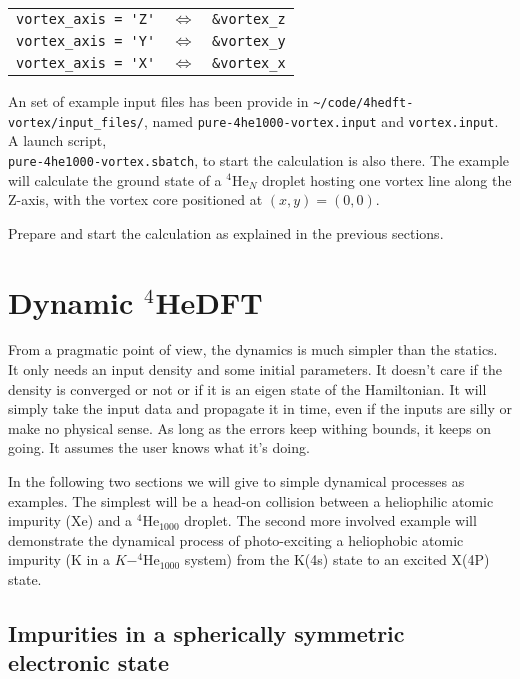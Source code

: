 \documentclass[10pt,a4paper]{article}
\begin{document}
	\begin{tabular}{ccc}
		\verb|vortex_axis = 'Z'|	& $\Longleftrightarrow$ & \verb|&vortex_z| \\
		\verb|vortex_axis = 'Y'|	& $\Longleftrightarrow$ & \verb|&vortex_y| \\
		\verb|vortex_axis = 'X'|	& $\Longleftrightarrow$ & \verb|&vortex_x| \\
	\end{tabular}
	
	An set of example input files has been provide in \verb|~/code/4hedft-vortex/input_files/|, named \verb|pure-4he1000-vortex.input| and \verb|vortex.input|. A launch script,\\ \verb|pure-4he1000-vortex.sbatch|, to start the calculation is also there. The example will calculate the ground state of a $^4$He$_N$ droplet hosting one vortex line along the Z-axis, with the vortex core positioned at $(x,y)=(0,0)$.
	
	Prepare and start the calculation as explained in the previous sections.
	
	\newpage
	
	\section{Dynamic $^4$HeDFT}
	From a pragmatic point of view, the dynamics is much simpler than the statics. It only needs an input density and some initial parameters. It doesn't care if the density is converged or not or if it is an eigen state of the Hamiltonian. It will simply take the input data and propagate it in time, even if the inputs are silly or make no physical sense. As long as the errors keep withing bounds, it keeps on going. It assumes the user knows what it's doing.
	
	In the following two sections we will give to simple dynamical processes as examples. The simplest will be a head-on collision between a heliophilic atomic impurity (Xe) and a $^4$He$_{1000}$ droplet. The second more involved example will demonstrate the dynamical process of photo-exciting a heliophobic atomic impurity (K in a $K-^4$He$_{1000}$ system) from the K(4s) state to an excited X(4P) state.
	
	\subsection{Impurities in a spherically symmetric electronic state}
	
\end{document}
